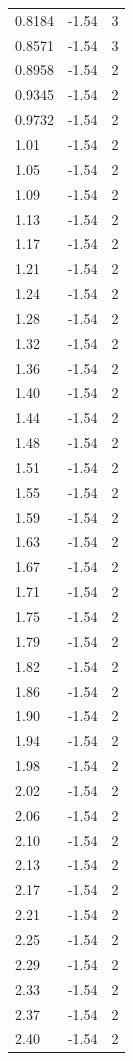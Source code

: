 \begin{longtable}{lrr}
  0.8184 & -1.54 & 3 \\
  0.8571 & -1.54 & 3 \\
  0.8958 & -1.54 & 2 \\
  0.9345 & -1.54 & 2 \\
  0.9732 & -1.54 & 2 \\
  1.01 & -1.54 & 2 \\
  1.05 & -1.54 & 2 \\
  1.09 & -1.54 & 2 \\
  1.13 & -1.54 & 2 \\
  1.17 & -1.54 & 2 \\
  1.21 & -1.54 & 2 \\
  1.24 & -1.54 & 2 \\
  1.28 & -1.54 & 2 \\
  1.32 & -1.54 & 2 \\
  1.36 & -1.54 & 2 \\
  1.40 & -1.54 & 2 \\
  1.44 & -1.54 & 2 \\
  1.48 & -1.54 & 2 \\
  1.51 & -1.54 & 2 \\
  1.55 & -1.54 & 2 \\
  1.59 & -1.54 & 2 \\
  1.63 & -1.54 & 2 \\
  1.67 & -1.54 & 2 \\
  1.71 & -1.54 & 2 \\
  1.75 & -1.54 & 2 \\
  1.79 & -1.54 & 2 \\
  1.82 & -1.54 & 2 \\
  1.86 & -1.54 & 2 \\
  1.90 & -1.54 & 2 \\
  1.94 & -1.54 & 2 \\
  1.98 & -1.54 & 2 \\
  2.02 & -1.54 & 2 \\
  2.06 & -1.54 & 2 \\
  2.10 & -1.54 & 2 \\
  2.13 & -1.54 & 2 \\
  2.17 & -1.54 & 2 \\
  2.21 & -1.54 & 2 \\
  2.25 & -1.54 & 2 \\
  2.29 & -1.54 & 2 \\
  2.33 & -1.54 & 2 \\
  2.37 & -1.54 & 2 \\
  2.40 & -1.54 & 2 \\

\end{longtable}
